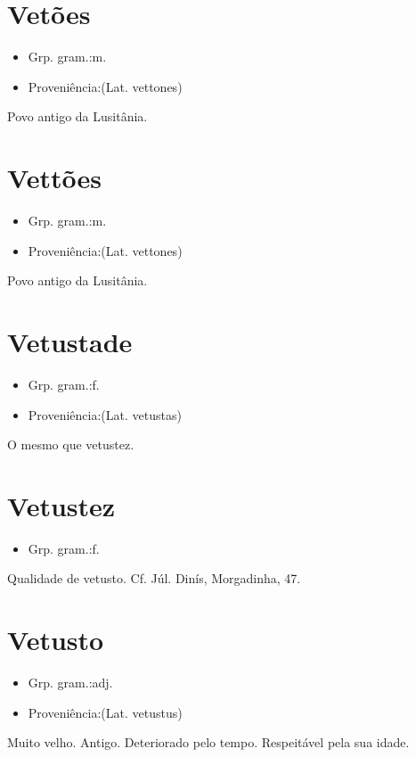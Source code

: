 \documentclass{article}
\begin{document}
\section{Vetões}
\begin{itemize}
\item {Grp. gram.:m.}
\end{itemize}
\begin{itemize}
\item {Proveniência:(Lat. \textunderscore vettones\textunderscore )}
\end{itemize}
Povo antigo da Lusitânia.
\section{Vettões}
\begin{itemize}
\item {Grp. gram.:m.}
\end{itemize}
\begin{itemize}
\item {Proveniência:(Lat. \textunderscore vettones\textunderscore )}
\end{itemize}
Povo antigo da Lusitânia.
\section{Vetustade}
\begin{itemize}
\item {Grp. gram.:f.}
\end{itemize}
\begin{itemize}
\item {Proveniência:(Lat. \textunderscore vetustas\textunderscore )}
\end{itemize}
O mesmo que \textunderscore vetustez\textunderscore .
\section{Vetustez}
\begin{itemize}
\item {Grp. gram.:f.}
\end{itemize}
Qualidade de vetusto. Cf. Júl. Dinís, \textunderscore Morgadinha\textunderscore , 47.
\section{Vetusto}
\begin{itemize}
\item {Grp. gram.:adj.}
\end{itemize}
\begin{itemize}
\item {Proveniência:(Lat. \textunderscore vetustus\textunderscore )}
\end{itemize}
Muito velho.
Antigo.
Deteriorado pelo tempo.
Respeitável pela sua idade.
\end{document}
